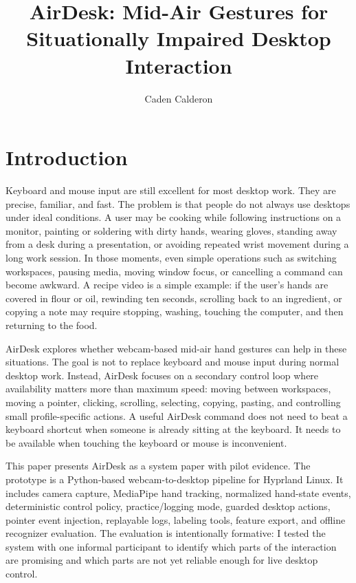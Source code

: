 \documentclass[manuscript]{acmart}
\title{AirDesk: Mid-Air Gestures for Situationally Impaired Desktop Interaction}
\author{Caden Calderon}
\affiliation{%
  \institution{Colorado State University}
  \city{Fort Collins}
  \state{Colorado}
  \country{USA}
}
\begin{document}
\maketitle

\section{Introduction}

Keyboard and mouse input are still excellent for most desktop work. They are precise, familiar, and fast. The problem is that people do not always use desktops under ideal conditions. A user may be cooking while following instructions on a monitor, painting or soldering with dirty hands, wearing gloves, standing away from a desk during a presentation, or avoiding repeated wrist movement during a long work session. In those moments, even simple operations such as switching workspaces, pausing media, moving window focus, or cancelling a command can become awkward. A recipe video is a simple example: if the user's hands are covered in flour or oil, rewinding ten seconds, scrolling back to an ingredient, or copying a note may require stopping, washing, touching the computer, and then returning to the food.

AirDesk explores whether webcam-based mid-air hand gestures can help in these situations. The goal is not to replace keyboard and mouse input during normal desktop work. Instead, AirDesk focuses on a secondary control loop where availability matters more than maximum speed: moving between workspaces, moving a pointer, clicking, scrolling, selecting, copying, pasting, and controlling small profile-specific actions. A useful AirDesk command does not need to beat a keyboard shortcut when someone is already sitting at the keyboard. It needs to be available when touching the keyboard or mouse is inconvenient.

This paper presents AirDesk as a system paper with pilot evidence. The prototype is a Python-based webcam-to-desktop pipeline for Hyprland Linux. It includes camera capture, MediaPipe hand tracking, normalized hand-state events, deterministic control policy, practice/logging mode, guarded desktop actions, pointer event injection, replayable logs, labeling tools, feature export, and offline recognizer evaluation. The evaluation is intentionally formative: I tested the system with one informal participant to identify which parts of the interaction are promising and which parts are not yet reliable enough for live desktop control.
\end{document}
